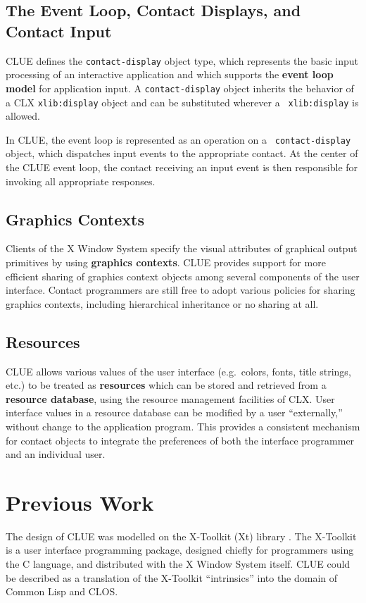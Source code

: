 \subsection{The Event Loop, Contact Displays, and Contact Input}
CLUE defines the {\tt contact-display} object type, which represents the
basic input processing of an interactive application and which supports
the {\bf event loop model} for application
input. 
A {\tt contact-display} object inherits the behavior of a CLX
{\tt xlib:display} object and can be substituted wherever a {\tt
xlib:display} is allowed.

In CLUE, the event loop is represented as an operation on a {\tt
contact-display} object, which dispatches input events to the
appropriate contact. At the center of the CLUE event loop,
the contact receiving an input event is then responsible for invoking all
appropriate responses.

\subsection{Graphics Contexts}
Clients of the X Window System
specify the visual attributes of graphical output primitives by using
{\bf graphics contexts}.
CLUE provides support for more efficient sharing of graphics context
objects among several components of the user interface.  Contact
programmers are still free to adopt various policies for sharing
graphics contexts, including hierarchical inheritance or no sharing at
all.

\subsection{Resources}
CLUE allows various values of
the
user interface (e.g.\ colors, fonts, title strings, etc.) to be treated as {\bf
resources} which can be stored and retrieved from  a {\bf resource
database}, using the resource management facilities of
CLX.  User interface values in a resource database can be modified
by a user ``externally,'' without change to the application program.
This provides a consistent mechanism for
contact objects to integrate the preferences of both the interface
programmer and an individual user.


\section{Previous Work}
The design of CLUE was modelled on the 
X-Toolkit (Xt) library
\cite{Xt}.
The X-Toolkit is a user interface programming package, designed chiefly for
programmers using the C language, and distributed with the X Window
System itself.  CLUE could be described as a translation of the X-Toolkit
``intrinsics'' into the domain of Common Lisp and CLOS.


